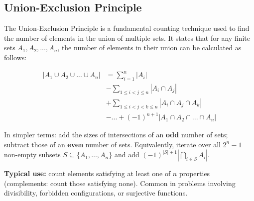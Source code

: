 \subsection{Union-Exclusion Principle}

The Union-Exclusion Principle is a fundamental counting technique used to find the number of elements in the union of multiple sets. It states that for any finite sets $A_1, A_2, ..., A_n$, the number of elements in their union can be calculated as follows:

\begin{align*}
    |A_1 \cup A_2 \cup ... \cup A_n| &= \sum_{i=1}^{n} |A_i| \\
    &- \sum_{1 \leq i < j \leq n} |A_i \cap A_j| \\
    &+ \sum_{1 \leq i < j < k \leq n} |A_i \cap A_j \cap A_k| \\
    &- ... + (-1)^{n+1} |A_1 \cap A_2 \cap ... \cap A_n|
\end{align*}

In simpler terms: add the sizes of intersections of an \textbf{odd} number of sets; subtract those of an \textbf{even} number of sets. Equivalently, iterate over all $2^n - 1$ non-empty subsets $S \subseteq \{A_1,\ldots,A_n\}$ and add $(-1)^{|S|+1}|\bigcap_{i \in S} A_i|$.

\textbf{Typical use:} count elements satisfying at least one of $n$ properties (complements: count those satisfying none). Common in problems involving divisibility, forbidden configurations, or surjective functions.